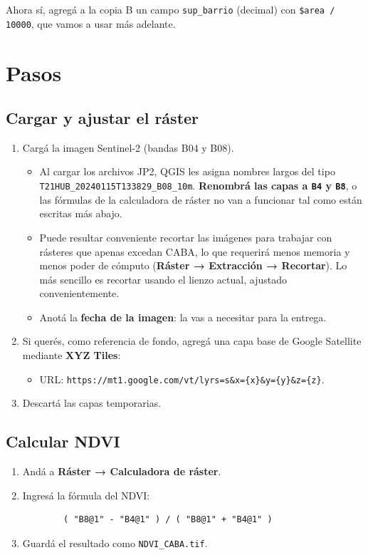 \documentclass{article}
\begin{document}
Ahora sí, agregá a la copia B un campo \texttt{sup\_barrio} (decimal) con \texttt{\$area / 10000}, que vamos a usar más adelante.

\section{Pasos}

\subsection{Cargar y ajustar el ráster}
\begin{enumerate}
    \item Cargá la imagen Sentinel-2 (bandas B04 y B08).
    \begin{itemize}
        \item Al cargar los archivos JP2, QGIS les asigna nombres largos del tipo \texttt{T21HUB\_\allowbreak 20240115T133829\_\allowbreak B08\_\allowbreak 10m}. \textbf{Renombrá las capas a \texttt{B4} y \texttt{B8}}, o las fórmulas de la calculadora de ráster no van a funcionar tal como están escritas más abajo.
        \item Puede resultar conveniente recortar las imágenes para trabajar con rásteres que apenas excedan CABA, lo que requerirá menos memoria y menos poder de cómputo (\textbf{Ráster → Extracción → Recortar}). Lo más sencillo es recortar usando el lienzo actual, ajustado convenientemente.
        \item Anotá la \textbf{fecha de la imagen}: la vas a necesitar para la entrega.
    \end{itemize}
    \item Si querés, como referencia de fondo, agregá una capa base de Google Satellite mediante \textbf{XYZ Tiles}:
    \begin{itemize}
        \item URL: \nolinkurl{https://mt1.google.com/vt/lyrs=s&x={x}&y={y}&z={z}}.
    \end{itemize}
    \item Descartá las capas temporarias.
\end{enumerate}

\subsection{Calcular NDVI}
\begin{enumerate}
    \item Andá a \textbf{Ráster → Calculadora de ráster}.
    \item Ingresá la fórmula del NDVI:
    \begin{verbatim}
        ( "B8@1" - "B4@1" ) / ( "B8@1" + "B4@1" )
    \end{verbatim}
    \item Guardá el resultado como \texttt{NDVI\_CABA.tif}.
\end{enumerate}
\end{document}

